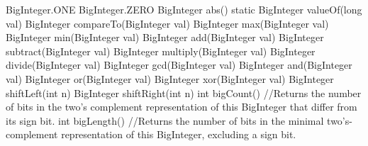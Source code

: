 BigInteger.ONE
BigInteger.ZERO
BigInteger abs()
static BigInteger valueOf(long val)
BigInteger compareTo(BigInteger val)
BigInteger max(BigInteger val)
BigInteger min(BigInteger val)
BigInteger add(BigInteger val)
BigInteger subtract(BigInteger val)
BigInteger multiply(BigInteger val)
BigInteger divide(BigInteger val)
BigInteger gcd(BigInteger val)
BigInteger and(BigInteger val)
BigInteger or(BigInteger val)
BigInteger xor(BigInteger val)
BigInteger shiftLeft(int n)
BigInteger shiftRight(int n)
int bigCount()
//Returns the number of bits in the two's complement representation of this BigInteger that differ from its sign bit.
int bigLength()
//Returns the number of bits in the minimal two's-complement representation of this BigInteger, excluding a sign bit.
